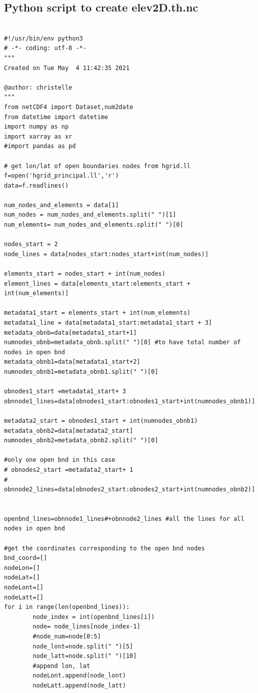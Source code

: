 \documentclass[preprints,briefreport,accept,oneauthor,pdftex]{Definitions/mdpi}
\begin{document}
\subsection{Python script to create elev2D.th.nc}
\begin{verbatim}

#!/usr/bin/env python3
# -*- coding: utf-8 -*-
"""
Created on Tue May  4 11:42:35 2021

@author: christelle
"""
from netCDF4 import Dataset,num2date
from datetime import datetime
import numpy as np
import xarray as xr
#import pandas as pd

# get lon/lat of open boundaries nodes from hgrid.ll
f=open('hgrid_principal.ll','r')
data=f.readlines()

num_nodes_and_elements = data[1]
num_nodes = num_nodes_and_elements.split(" ")[1]
num_elements= num_nodes_and_elements.split(" ")[0]

nodes_start = 2
node_lines = data[nodes_start:nodes_start+int(num_nodes)]

elements_start = nodes_start + int(num_nodes) 
element_lines = data[elements_start:elements_start + int(num_elements)]

metadata1_start = elements_start + int(num_elements) 
metadata1_line = data[metadata1_start:metadata1_start + 3]
metadata_obnb=data[metadata1_start+1]
numnodes_obnb=metadata_obnb.split(" ")[0] #to have total number of nodes in open bnd
metadata_obnb1=data[metadata1_start+2]
numnodes_obnb1=metadata_obnb1.split(" ")[0] 

obnodes1_start =metadata1_start+ 3
obnnode1_lines=data[obnodes1_start:obnodes1_start+int(numnodes_obnb1)]

metadata2_start = obnodes1_start + int(numnodes_obnb1)
metadata_obnb2=data[metadata2_start]
numnodes_obnb2=metadata_obnb2.split(" ")[0]

#only one open bnd in this case
# obnodes2_start =metadata2_start+ 1
# obnnode2_lines=data[obnodes2_start:obnodes2_start+int(numnodes_obnb2)]


openbnd_lines=obnnode1_lines#+obnnode2_lines #all the lines for all nodes in open bnd

#get the coordinates corresponding to the open bnd nodes
bnd_coord=[]
nodeLon=[]
nodeLat=[]
nodeLont=[]
nodeLatt=[]
for i in range(len(openbnd_lines)):
        node_index = int(openbnd_lines[i])
        node= node_lines[node_index-1]
        #node_num=node[0:5]
        node_lont=node.split(" ")[5]
        node_latt=node.split(" ")[10]
        #append lon, lat
        nodeLont.append(node_lont)
        nodeLatt.append(node_latt)


\end{verbatim}
\end{document}
